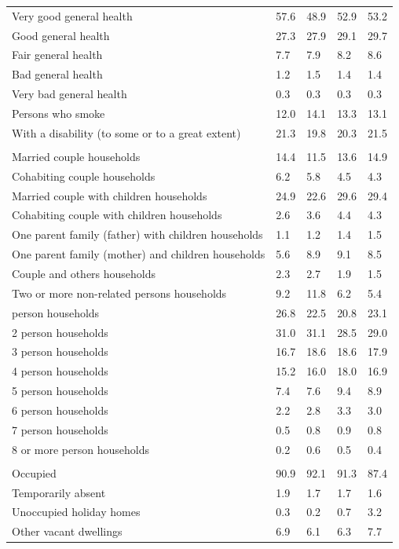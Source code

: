 \documentclass{article}
\begin{document}
\begin{table}[h]
\begin{tabular}{KTTTT}
    \hline
Very good general health & 57.6& 48.9&52.9& 53.2\\
Good general health & 27.3& 27.9& 29.1& 29.7\\
Fair general health & 7.7& 7.9&8.2& 8.6\\
Bad general health & 1.2& 1.5&1.4& 1.4\\
Very bad general health & 0.3& 0.3&0.3& 0.3\\
    \hline
Persons who smoke & 12.0& 14.1&13.3& 13.1\\
    \hline
With a disability (to some or to a great extent) & 21.3& 19.8&20.3& 21.5\\
\hline
    \\ 
    \hline
Married couple households & 14.4& 11.5& 13.6& 14.9\\
Cohabiting couple households & 6.2& 5.8& 4.5& 4.3\\
Married couple with children households & 24.9& 22.6& 29.6& 29.4\\
Cohabiting couple with children households & 2.6& 3.6& 4.4& 4.3\\
One parent family (father) with  children households & 1.1& 1.2& 1.4& 1.5\\
One parent family (mother) and children households & 5.6& 8.9& 9.1& 8.5\\
Couple and others households  & 2.3& 2.7& 1.9& 1.5\\
Two or more non-related persons households &  9.2& 11.8&  6.2&  5.4\\
     person households & 26.8& 22.5& 20.8& 23.1\\
2 person households & 31.0& 31.1& 28.5& 29.0\\
3 person households & 16.7& 18.6& 18.6& 17.9\\
4 person households & 15.2& 16.0& 18.0& 16.9\\
5 person households & 7.4& 7.6& 9.4& 8.9\\
6 person households & 2.2& 2.8& 3.3& 3.0\\
7 person households & 0.5& 0.8& 0.9& 0.8\\
8 or more person households & 0.2& 0.6& 0.5& 0.4\\
\hline
    \\ 
    \hline
Occupied & 90.9& 92.1& 91.3& 87.4\\
Temporarily absent & 1.9& 1.7& 1.7& 1.6\\
Unoccupied holiday homes & 0.3& 0.2& 0.7& 3.2\\
Other vacant dwellings & 6.9& 6.1& 6.3& 7.7\\
\hline
\end{tabular}
\end{table}
\end{document}
